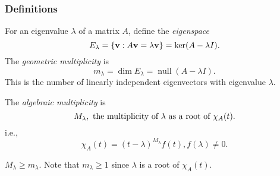 \documentclass[10pt]{article}
\def\ge{\geqslant}
\DeclareMathOperator{\nullity}{null}
\begin{document}
    \subsubsection{Definitions}
    \begin{definition}
        For an eigenvalue $ \lambda $ of a matrix $A$, define the \textit{eigenspace}
        \[
            E_\lambda=\left\{ {\bf v}:A{\bf v}=\lambda{\bf v} \right\}=\ker (A-\lambda I) 
        .\]
        The \textit{geometric multiplicity} is 
        \[
            m_\lambda=\dim E_\lambda=\nullity(A-\lambda I)
        .\]
        This is the number of linearly independent eigenvectors with eigenvalue $ \lambda $.

        The \textit{algebraic multiplicity} is
        \[
            M_\lambda, \text{ the multiplicity of $\lambda$ as a root of $ \chi_A(t) $}
        .\]
        i.e.,
        \[
            \chi_A(t)=(t-\lambda)^{M_\lambda}f(t), f(\lambda)\neq 0
        .\]
    \end{definition}
    \begin{proposition}
        $ M_\lambda\ge m_\lambda $. Note that $ m_\lambda\ge 1 $ since $ \lambda $ is a root of $ \chi_A(t) $.
    \end{proposition}
\end{document}
